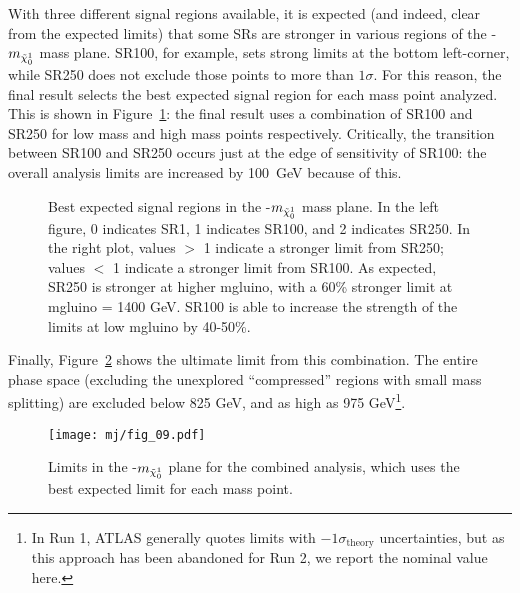 With three different signal regions available, it is expected (and indeed, clear from the expected limits) that some SRs are stronger in various regions of the \mgluino-$m_{\tilde{\chi}_0^1}$ mass plane. SR100, for example, sets strong limits at the bottom left-corner, while SR250 does not exclude those points to more than $1 \sigma$. For this reason, the final result selects the best expected signal region for each mass point analyzed. This is shown in Figure~\ref{fig:search:limits:optimal}: the final result uses a combination of SR100 and SR250 for low mass and high mass points respectively. Critically, the transition between SR100 and SR250 occurs just at the edge of sensitivity of SR100: the overall analysis limits are increased by 100~GeV because of this.


\begin{figure}[!ht]
  \centering
  
    
  \caption{Best expected signal regions in the \mgluino-$m_{\tilde{\chi}_0^1}$ mass plane. In the left figure, 0 indicates SR1, 1 indicates SR100, and 2 indicates SR250. In the right plot, values $>$ 1 indicate a stronger limit from SR250; values $<$ 1 indicate a stronger limit from SR100. As expected, SR250 is stronger at higher mgluino, with a 60\% stronger limit at mgluino = 1400 GeV. SR100 is able to increase the strength of the limits at low mgluino by 40-50\%. } 
               
  \label{fig:search:limits:optimal}
\end{figure}


Finally, Figure~\ref{fig:search:limits:combined} shows the ultimate limit from this combination. The entire phase space (excluding the unexplored ``compressed'' regions with small mass splitting) are excluded below 825 GeV, and as high as 975 GeV\footnote{In Run 1, ATLAS generally quotes limits with $-1\sigma_\mathrm{theory}$ uncertainties, but as this approach has been abandoned for Run 2, we report the nominal value here.}. 


\begin{figure}
\centering
\texttt{[image: mj/fig\_09.pdf]}
\label{fig:search:limits:combined}
\caption{Limits in the \mgluino-$m_{\tilde{\chi}_0^1}$ plane for the combined analysis, which uses the best expected limit for each mass point.}
\end{figure}

